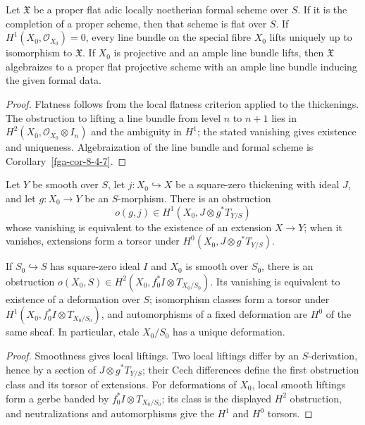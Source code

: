 \begin{corollary}\label{fga-cor-8-5-6}
Let $\mathfrak X$ be a proper flat adic locally noetherian formal scheme over
$S$.  If it is the completion of a proper scheme, then that scheme is flat over
$S$.  If $H^1(X_0,\mathcal O_{X_0})=0$, every line bundle on the special fibre
$X_0$ lifts uniquely up to isomorphism to $\mathfrak X$.  If $X_0$ is projective
and an ample line bundle lifts, then $\mathfrak X$ algebraizes to a proper flat
projective scheme with an ample line bundle inducing the given formal data.
\end{corollary}
\begin{proof}
Flatness follows from the local flatness criterion applied to the thickenings.
The obstruction to lifting a line bundle from level $n$ to $n+1$ lies in
$H^2(X_0,\mathcal O_{X_0}\otimes I_n)$ and the ambiguity in $H^1$; the stated
vanishing gives existence and uniqueness.  Algebraization of the line bundle and
formal scheme is Corollary~\ref{fga-cor-8-4-7}.
\end{proof}

\begin{theorem}\label{fga-the-8-5-9}
Let $Y$ be smooth over $S$, let $j:X_0\hookrightarrow X$ be a square-zero
thickening with ideal $J$, and let $g:X_0\to Y$ be an $S$-morphism.  There is
an obstruction
\[
o(g,j)\in H^1(X_0,J\otimes g^*T_{Y/S})
\]
whose vanishing is equivalent to the existence of an extension $X\to Y$; when
it vanishes, extensions form a torsor under
$H^0(X_0,J\otimes g^*T_{Y/S})$.

If $S_0\hookrightarrow S$ has square-zero ideal $I$ and $X_0$ is smooth over
$S_0$, there is an obstruction
$o(X_0,S)\in H^2(X_0,f_0^*I\otimes T_{X_0/S_0})$.  Its vanishing is equivalent
to existence of a deformation over $S$; isomorphism classes form a torsor under
$H^1(X_0,f_0^*I\otimes T_{X_0/S_0})$, and automorphisms of a fixed deformation
are $H^0$ of the same sheaf.  In particular, etale $X_0/S_0$ has a unique
deformation.
\end{theorem}
\begin{proof}
Smoothness gives local liftings.  Two local liftings differ by an
$S$-derivation, hence by a section of $J\otimes g^*T_{Y/S}$; their Cech
differences define the first obstruction class and its torsor of extensions.
For deformations of $X_0$, local smooth liftings form a gerbe banded by
$f_0^*I\otimes T_{X_0/S_0}$; its class is the displayed $H^2$ obstruction,
and neutralizations and automorphisms give the $H^1$ and $H^0$ torsors.
\end{proof}

